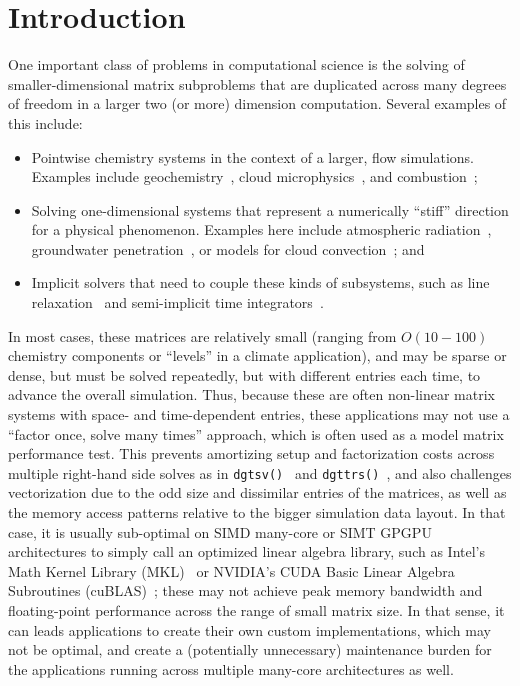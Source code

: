 \documentclass{sig-alternate-05-2015}
\begin{document}
\section{Introduction}
\label{sec:introduction}

One important class of problems in computational science is the solving
  of smaller-dimensional matrix subproblems that are duplicated across
  many degrees of freedom in a larger two (or more) dimension computation.
Several examples of this include: 
\begin{itemize}
\item Pointwise chemistry systems in the context of a larger, 
  flow simulations. 
Examples include geochemistry~\cite{PFLOTRAN_2010}, 
  cloud microphysics~\cite{MG2_2015}, and combustion~\cite{PaznerEtAl_2016};
\item Solving one-dimensional systems that represent a numerically ``stiff''
  direction for a physical phenomenon.
Examples here include atmospheric radiation~\cite{RRTMG_2008}, groundwater
  penetration~\cite{CLM_PFLO_2016}, or models for 
  cloud convection~\cite{SAM_2005}; and
\item Implicit solvers that need to couple these kinds of subsystems, 
  such as line relaxation~\cite{TrottenbergEtAl_2000} and 
  semi-implicit time integrators~\cite{WellerEtAl_2013}.
\end{itemize}
In most cases, these matrices are relatively small 
  (ranging from \(O(10-100)\) chemistry components or ``levels'' 
  in a climate application), and may be sparse or dense, but must 
  be solved repeatedly, but with different entries each time, 
  to advance the overall simulation.
Thus, because these are often non-linear matrix systems with space- and 
  time-dependent entries, these applications may not use a 
  ``factor once, solve many times'' approach, which is often used 
  as a model matrix performance test.
This prevents amortizing setup and factorization costs
  across multiple right-hand side solves as in 
  \lstinline{dgtsv()}~\cite{IntelMKL_DGTSV} and \lstinline{dgttrs()}~\cite{IntelMKL_DGTTRS},
  and also challenges vectorization due to the odd size and
  dissimilar entries of the matrices, as well as the 
  memory access patterns relative to the bigger simulation data layout.
In that case, it is usually sub-optimal on SIMD many-core or SIMT GPGPU
  architectures to simply call an optimized linear algebra library, 
  such as Intel's Math Kernel Library (MKL)~\cite{mkl_website} or NVIDIA's
  CUDA Basic Linear Algebra Subroutines (cuBLAS)~\cite{cublas_website}; these
  may not achieve peak memory bandwidth and floating-point performance across 
  the range of small matrix size. 
In that sense, it can leads applications to create their own 
  custom implementations, which may not be optimal, and create a 
  (potentially unnecessary) maintenance burden for the applications 
  running across multiple many-core architectures as well. 
  
\end{document}
